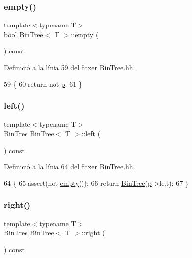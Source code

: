 \subsubsection{\texorpdfstring{empty()}{empty()}}
{\footnotesize\ttfamily template$<$typename T$>$ \\
bool \hyperlink{class_bin_tree}{Bin\+Tree}$<$ T $>$\+::empty (\begin{DoxyParamCaption}{ }\end{DoxyParamCaption}) const}



Definició a la línia 59 del fitxer Bin\+Tree.\+hh.


\begin{DoxyCode}
59                         \{
60         \textcolor{keywordflow}{return} not \hyperlink{class_bin_tree_afe3647af1dda90f6ddf1deee6560fcf1}{p};
61     \}
\end{DoxyCode}
\mbox{\label{class_bin_tree_a82108db4c1b08d1f111027788c196d4e}} 
\subsubsection{\texorpdfstring{left()}{left()}}
{\footnotesize\ttfamily template$<$typename T$>$ \\
\hyperlink{class_bin_tree}{Bin\+Tree} \hyperlink{class_bin_tree}{Bin\+Tree}$<$ T $>$\+::left (\begin{DoxyParamCaption}{ }\end{DoxyParamCaption}) const}



Definició a la línia 64 del fitxer Bin\+Tree.\+hh.


\begin{DoxyCode}
64                           \{
65         assert(not \hyperlink{class_bin_tree_a74cda259ba5c25b8ee38ed4dc33e4fad}{empty}());
66         \textcolor{keywordflow}{return} \hyperlink{class_bin_tree_a47eef22d29cd023449d97c073c08e5b6}{BinTree}(\hyperlink{class_bin_tree_afe3647af1dda90f6ddf1deee6560fcf1}{p}->left);
67     \}
\end{DoxyCode}
\mbox{\label{class_bin_tree_aff8e96651b27284c329667b5ad3e4d0b}} 
\subsubsection{\texorpdfstring{right()}{right()}}
{\footnotesize\ttfamily template$<$typename T$>$ \\
\hyperlink{class_bin_tree}{Bin\+Tree} \hyperlink{class_bin_tree}{Bin\+Tree}$<$ T $>$\+::right (\begin{DoxyParamCaption}{ }\end{DoxyParamCaption}) const}



